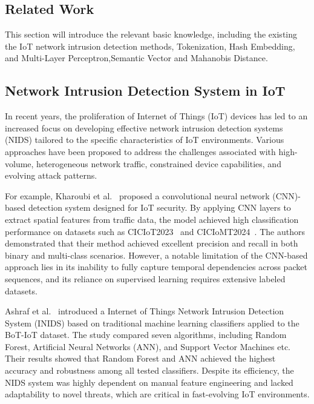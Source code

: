 \begin{ZhChapter}
    \chapter{Related Work}
    This section will introduce the relevant basic knowledge, including the existing the IoT network intrusion detection methods, Tokenization, Hash Embedding, and Multi-Layer Perceptron,Semantic Vector and Mahanobis Distance.

    \section{Network Intrusion Detection System in IoT}
    In recent years, the proliferation of Internet of Things (IoT) devices has led to an increased focus on developing effective network intrusion detection systems (NIDS) tailored to the specific characteristics of IoT environments. Various approaches have been proposed to address the challenges associated with high-volume, heterogeneous network traffic, constrained device capabilities, and evolving attack patterns.

    For example, Kharoubi et al.~\cite{kharoubi2025nidscnn} proposed a convolutional neural network (CNN)-based detection system designed for IoT security. By applying CNN layers to extract spatial features from traffic data, the model achieved high classification performance on datasets such as CICIoT2023~\cite{ciciot2023} and CICIoMT2024~\cite{ciciot2024}. The authors demonstrated that their method achieved excellent precision and recall in both binary and multi-class scenarios. However, a notable limitation of the CNN-based approach lies in its inability to fully capture temporal dependencies across packet sequences, and its reliance on supervised learning requires extensive labeled datasets.

    Ashraf et al.~\cite{ashraf2025inids} introduced a Internet of Things Network Intrusion Detection System (INIDS) based on traditional machine learning classifiers applied to the BoT-IoT dataset. The study compared seven algorithms, including Random Forest, Artificial Neural Networks (ANN), and Support Vector Machines etc. Their results showed that Random Forest and ANN achieved the highest accuracy and robustness among all tested classifiers. Despite its efficiency, the NIDS system was highly dependent on manual feature engineering and lacked adaptability to novel threats, which are critical in fast-evolving IoT environments.


\end{ZhChapter}
